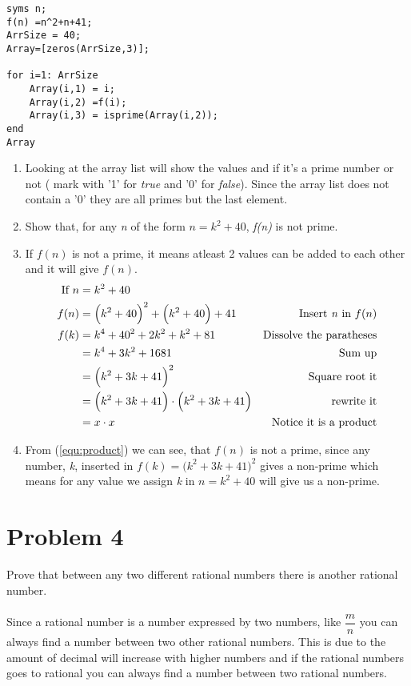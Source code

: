 \documentclass[english,10pt,a4paper]{article}
\begin{document}
\begin{lstlisting}[caption=title, style=Code-Matlab, label=lst:ref]
syms n;
f(n) =n^2+n+41;
ArrSize = 40;
Array=[zeros(ArrSize,3)];

for i=1: ArrSize
    Array(i,1) = i;
    Array(i,2) =f(i);
    Array(i,3) = isprime(Array(i,2));
end
Array
\end{lstlisting}
\begin{enumerate}[b]
\item[] Looking at the array list will show the values and if it's a prime number or not ( mark with '1' for \textit{true} and '0' for \textit{false}).
Since the array list does not contain a '0' they are all primes but the last element.

\item Show that, for any \textit{n} of the form $n = k^2 + 40$, \textit{f(n)} is not prime.
\item[] If $f(n)$ is not a prime, it means atleast 2 values can be added to each other and it will give $f(n)$.
\begin{align}
\text{If } n &= k^2 + 40 \\
f(n) &=\Big(k^2+40\Big)^2+\Big(k^2+40\Big)+41  & \text{Insert \textit{n} in } f(n)\\
f(k) &= k^4 + 40^2 + 2k^2+k^2+81 & \text{Dissolve the paratheses}\\
	&= k^4+3k^2+1681 & \text{Sum up}\\
	&= \Big(k^2+3k+41 \Big)^2 & \text{Square root it}\\
	&= \Big( k^2+3k+41 \Big) \cdot \Big( k^2+3k+41 \Big) & \text{rewrite it} \\
	&= x \cdot x & \text{Notice it is a product} \label{equ:product}
\end{align}
\item[] From (\ref{equ:product}) we can see, that $f(n)$ is not a prime, since any number, \textit{k}, inserted in $f(k) =\Big(k^2+3k+41 \Big)^2$ gives a non-prime which means for any value we assign \textit{k} in $n=k^2+40$ will give us a non-prime.
\end{enumerate}



\section*{Problem 4}
Prove that between any two different rational numbers there is another rational number.
\\
\\
Since a rational number is a number expressed by two numbers, like $\dfrac{m}{n}$ you can always find a number between two other rational numbers.
This is due to the amount of decimal will increase with higher numbers and if the rational numbers goes to rational you can always find a number between two rational numbers.
\end{document}
